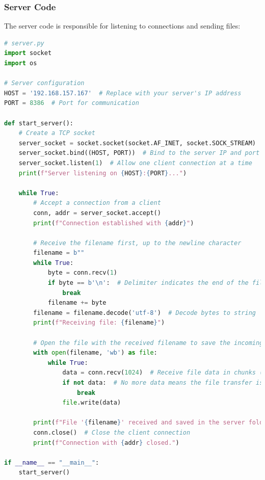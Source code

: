 \documentclass{article}
\begin{document}
\subsubsection{Server Code}
The server code is responsible for listening to connections and sending files:
\begin{lstlisting}[language=Python, caption=Server Code]
# server.py
import socket
import os

# Server configuration
HOST = '192.168.157.167'  # Replace with your server's IP address
PORT = 8386  # Port for communication

def start_server():
    # Create a TCP socket
    server_socket = socket.socket(socket.AF_INET, socket.SOCK_STREAM)
    server_socket.bind((HOST, PORT))  # Bind to the server IP and port
    server_socket.listen(1)  # Allow one client connection at a time
    print(f"Server listening on {HOST}:{PORT}...")

    while True:
        # Accept a connection from a client
        conn, addr = server_socket.accept()
        print(f"Connection established with {addr}")

        # Receive the filename first, up to the newline character
        filename = b""
        while True:
            byte = conn.recv(1)
            if byte == b'\n':  # Delimiter indicates the end of the filename
                break
            filename += byte
        filename = filename.decode('utf-8')  # Decode bytes to string
        print(f"Receiving file: {filename}")

        # Open the file with the received filename to save the incoming data
        with open(filename, 'wb') as file:
            while True:
                data = conn.recv(1024)  # Receive file data in chunks (1KB)
                if not data:  # No more data means the file transfer is complete
                    break
                file.write(data)

        print(f"File '{filename}' received and saved in the server folder.")
        conn.close()  # Close the client connection
        print(f"Connection with {addr} closed.")

if __name__ == "__main__":
    start_server()
\end{lstlisting}
\end{document}
